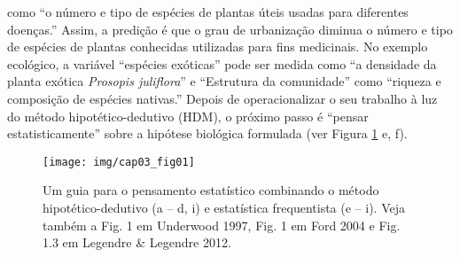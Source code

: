 \documentclass[
]{article}
\begin{document}
como ``o número e tipo de espécies de plantas úteis usadas para diferentes doenças.'' Assim, a predição é que o grau de urbanização diminua o número e tipo de espécies de plantas conhecidas utilizadas para fins medicinais. No exemplo ecológico, a variável ``espécies exóticas'' pode ser medida como ``a densidade da planta exótica \emph{Prosopis juliflora}'' e ``Estrutura da comunidade'' como ``riqueza e composição de espécies nativas.'' Depois de operacionalizar o seu trabalho à luz do método hipotético-dedutivo (HDM), o próximo passo é ``pensar estatisticamente'' sobre a hipótese biológica formulada (ver Figura \ref{fig:fig-statistical-thinking} e, f).

\begin{figure}

{\centering \texttt{[image: img/cap03\_fig01]} 

}

\caption{Um guia para o pensamento estatístico combinando o método hipotético-dedutivo (a -- d, i) e estatística frequentista (e -- i). Veja também a Fig. 1 em Underwood 1997, Fig. 1 em Ford 2004 e Fig. 1.3 em Legendre & Legendre 2012.}\label{fig:fig-statistical-thinking}
\end{figure}
\end{document}
